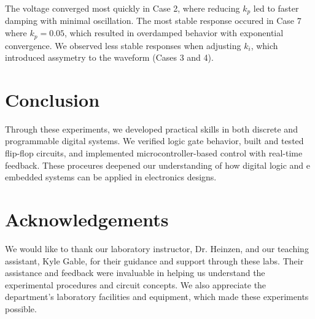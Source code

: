 \documentclass{article}
\begin{document}
\noindent The voltage converged most quickly in Case 2, where reducing $k_p$
led to faster damping with minimal oscillation. The most stable response occured
in Case 7 where $k_p=0.05$, which resulted in overdamped behavior with exponential
convergence. We observed less stable responses when adjusting $k_i$, which
introduced assymetry to the waveform (Cases 3 and 4). 


\section*{Conclusion}

Through these experiments, we developed practical skills in both discrete and
programmable digital systems. We verified logic gate behavior, built and tested
flip-flop circuits, and implemented microcontroller-based control with real-time
feedback. These proceures deepened our understanding of how digital logic and e
embedded systems can be applied in electronics designs.

\section*{Acknowledgements}

We would like to thank our laboratory instructor, Dr. Heinzen, and our teaching 
assistant, Kyle Gable, for their guidance and support through these labs. Their 
assistance and feedback were invaluable in helping us understand the experimental 
procedures and circuit concepts. We also appreciate the department's laboratory 
facilities and equipment, which made these experiments possible.
\end{document}
